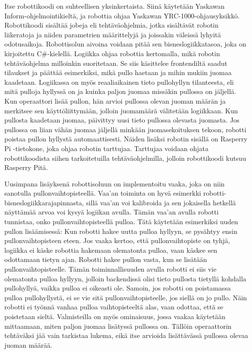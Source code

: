 Itse robottikoodi on suhteellisen yksinkertaista. Siinä käytetään Yaskawan Inform\hyp{}ohjelmointikieltä, ja robottia ohjaa Yaskawan YRC\hyp{}1000\hyp{}ohjausyksikkö. Robottikoodi sisältää jobeja eli tehtäväohjelmia, jotka sisältävät robotin liikeratoja ja niiden parametrien määrittelyjä ja joissakin väleissä lyhyitä odotusaikoja. Robottisolun aivoina voidaan pitää sen bisneslogiikkatasoa, joka on kirjoitettu C\#-kielellä. Logiikka ohjaa robottia kertomalla, mikä robotin tehtäväohjelma milloinkin suoritetaan. Se siis käsittelee frontendiltä saadut tilaukset ja päättää esimerkiksi, mikä pullo haetaan ja mihin mukiin juomaa kaadetaan. Logiikassa on myös reaaliaikainen tieto pullohyllyn tilanteesta, eli mitä pulloja hyllyssä on ja kuinka paljon juomaa missäkin pullossa on jäljellä. Kun operaattori lisää pullon, hän arvioi pullossa olevan juoman määrän ja merkitsee sen käyttöliittymään, jolloin juomamäärä välitetään logiikkaan. Kun pullosta kaadetaan juomaa, päivittyy uusi tieto pullossa olevasta juomasta. Jos pullossa on liian vähän juomaa jäljellä minkään juomasekoituksen tekoon, robotti poistaa pullon hyllystä automaattisesti. Näiden lisäksi robotin sisällä on Rasperry Pi -tietokone, joka ohjaa robotin tarttujaa. Tarttujaa voidaan ohjata robottikoodista siihen tarkoitetuilla tehtäväohjelmilla, jolloin robottikoodi kutsuu Rasperry Pitä.

Uusimpana lisäyksenä robottisoluun on implementoitu vaaka, joka on niin sanotulla pullonvaihtopisteellä. Vaa'an toiminta on hyvä esimerkki robotti-bisneslogiikkarajapinnasta, sillä vaa'an voi kalibroida ja sen jokaisella hetkellä näyttämää arvoa voi kysyä logiikan avulla. Tämän vaa'an avulla robotti tunnistaa, onko pullonvaihtopisteellä pulloa. Tätä käytetään esimerkiksi uuden pullon lisäämisessä: Kun robotti hakee uutta pulloa hyllyyn, se pysähtyy ensin pullonvaihtopisteen eteen. Jos vaaka kertoo, että pullonvaihtopiste on tyhjä, logiikka ei käske robottia hakemaan olematonta pulloa, vaan käskee sen odottamaan tietyn ajan. Robotti hakee pullon vasta, kun se lisätään pullonvaihtopisteelle. Tämän toiminnallisuuden avulla robotti ei siis vie olematonta pulloa hyllyyn, jolloin backendissä olisi tieto pullosta tietyllä kohdalla pullohyllyä, vaikka pulloa ei oikeasti ole. Samoin, jos robotti on poistamassa pulloa pullohyllystä, ei se vie sitä pullonvaihtopisteelle, jos siellä on jo pullo. Näin robotti ei työnnä vanhaa pulloa vaihtopisteeltä alas, vaan odottaa, että se poistetaan sieltä. Valmisteilla on myös ominaisuus, jossa vaakaa käytetään mittaamaan, miten paljon juomaa lisätyssä pullossa on. Tällöin operaattorin tehtäväksi jää vain tarkistaa lukema, eikä itse arvioida lisättävässä pullossa olevaa juoman määrää.

